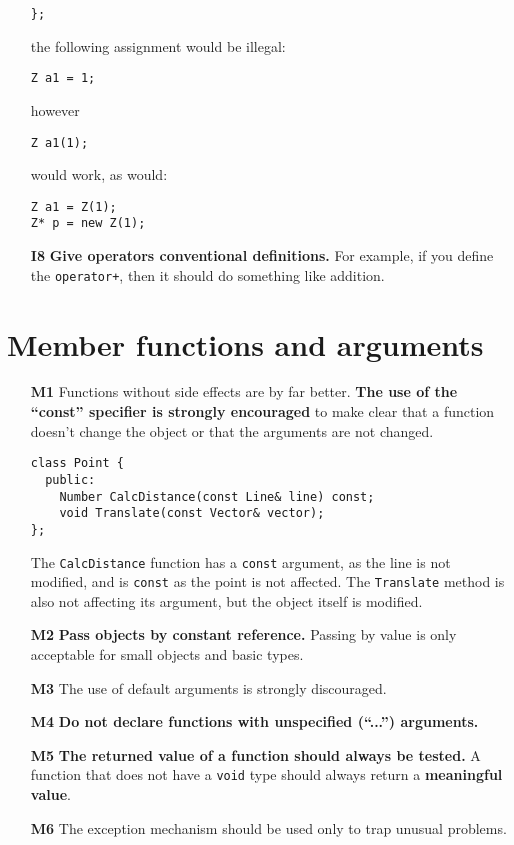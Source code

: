 \begin{itemize}
\begin{verbatim}
};
  \end{verbatim}
  the following assignment would be illegal: 
  \begin{verbatim}
Z a1 = 1;
  \end{verbatim}
  however 
  \begin{verbatim}
Z a1(1);    
  \end{verbatim}
  would work, as would: 
  \begin{verbatim}
Z a1 = Z(1);
Z* p = new Z(1);
  \end{verbatim} 
\item[\bf I8] {\bf Give operators conventional definitions.} For example, 
  if you define the {\tt operator+}, then it should do something like addition.

\end{itemize}

\section{Member functions and arguments}
\begin{itemize}
\item[\bf M1] Functions without side effects are by far better. {\bf The use
  of the ``const'' specifier is strongly encouraged} to make clear that a
  function doesn't change the object or that the arguments are not changed.
  \begin{verbatim}
class Point {
  public:
    Number CalcDistance(const Line& line) const;
    void Translate(const Vector& vector);
};
  \end{verbatim}
  The {\tt CalcDistance} function has a {\tt const} argument, as the line is
  not modified, and is {\tt const} as the point is not affected. The
  {\tt Translate} method is also not affecting its argument, but the object
  itself is modified.
\item[\bf M2] {\bf Pass objects by constant reference.} Passing by value is
  only acceptable for small objects and basic types.
\item[\bf M3] The use of default arguments is strongly discouraged.
\item[\bf M4] {\bf Do not declare functions with unspecified (``...'') 
  arguments.}
\item[\bf M5] {\bf The returned value of a function should always be tested.}
  A function that does not have a {\tt void} type should always return a
  {\bf meaningful value}.
\item[\bf M6] The exception mechanism should be used only to trap unusual
  problems.
\end{itemize}

